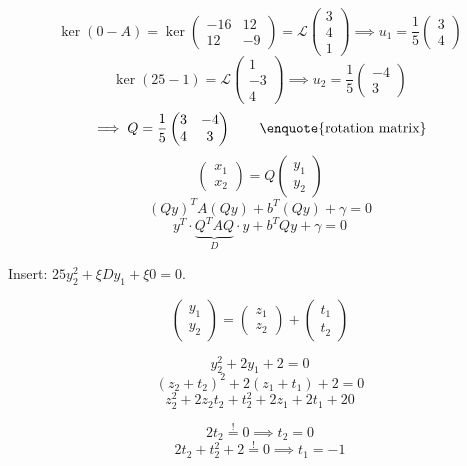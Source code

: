 \documentclass[a4paper]{article}
\theoremstyle{definition}
\begin{document}
\[ \ker(0 - A) = \ker\begin{pmatrix} -16 & 12 \\ 12 & -9 \end{pmatrix} = \mathcal L\begin{pmatrix} 3 \\ 4 \\ 1 \end{pmatrix} \implies u_1 = \frac15 \begin{pmatrix} 3 \\ 4 \end{pmatrix} \]
\[ \ker(25 - 1) = \mathcal L\begin{pmatrix} 1 \\ -3 \\ 4 \end{pmatrix} \implies u_2 = \frac15 \begin{pmatrix} -4 \\ 3 \end{pmatrix} \]
\[ \implies Q = \frac15 \begin{pmatrix} 3 & -4 \\ 4 & 3 \end{pmatrix} \qquad \text{\enquote{rotation matrix}} \]
\[ \begin{pmatrix} x_1 \\ x_2 \end{pmatrix} = Q \begin{pmatrix} y_1 \\ y_2 \end{pmatrix} \]
\[ (Qy)^T A (Qy) + b^T (Qy) + \gamma = 0 \]
\[ y^T \cdot \underbrace{Q^T A Q}_{D} \cdot y + b^T Q y + \gamma = 0 \]

Insert: $25y_2^2 + \xi D y_1 + \xi 0 = 0$.

\[ \begin{pmatrix} y_1 \\ y_2 \end{pmatrix} = \begin{pmatrix} z_1 \\ z_2 \end{pmatrix} + \begin{pmatrix} t_1 \\ t_2 \end{pmatrix} \]

\[ y_2^2 + 2y_1 + 2 = 0 \]
\[ (z_2 + t_2)^2 + 2 (z_1 + t_1) + 2 = 0 \]
\[ z_2^2 + 2z_2 t_2 + t_2^2 + 2z_1 + 2t_1 + 20 \]

\[ 2t_2 \overset!= 0 \implies t_2 = 0 \]
\[ 2t_2 + t_2^2 +2 \overset!= 0 \implies t_1 = -1 \]
\end{document}
